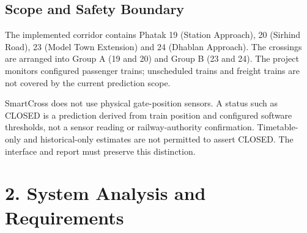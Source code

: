 \documentclass[12pt,a4paper]{report}
\begin{document}
\section{Scope and Safety Boundary}
The implemented corridor contains Phatak 19 (Station Approach), 20 (Sirhind Road), 23 (Model Town Extension) and 24 (Dhablan Approach). The crossings are arranged into Group A (19 and 20) and Group B (23 and 24). The project monitors configured passenger trains; unscheduled trains and freight trains are not covered by the current prediction scope.

SmartCross does not use physical gate-position sensors. A status such as CLOSED is a prediction derived from train position and configured software thresholds, not a sensor reading or railway-authority confirmation. Timetable-only and historical-only estimates are not permitted to assert CLOSED. The interface and report must preserve this distinction.

\chapter{2. System Analysis and Requirements}
\end{document}
